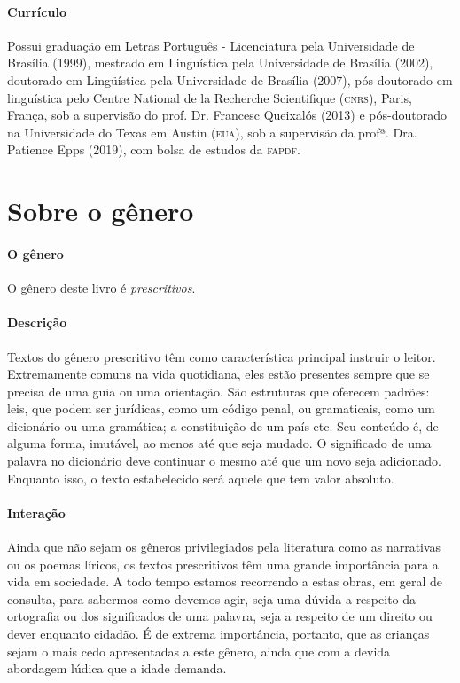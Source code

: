 \documentclass[11pt]{extarticle}
\begin{document}
{{\paragraph{Currículo}
Possui graduação em Letras Português - Licenciatura pela Universidade de Brasília (1999), mestrado em Linguística pela Universidade de Brasília (2002), doutorado em Lingüística pela Universidade de Brasília (2007), pós-doutorado em linguística pelo Centre National de la Recherche Scientifique (\textsc{cnrs}), Paris, França, sob a supervisão do prof. Dr. Francesc Queixalós (2013) e pós-doutorado na Universidade do Texas em Austin (\textsc{eua}), sob a supervisão da profª. Dra. Patience Epps (2019), com bolsa de estudos da \textsc{fapdf}. 


\section{Sobre o gênero}

\paragraph{O gênero} O gênero deste livro é \textit{prescritivos}. 

\paragraph{Descrição} 
Textos do gênero prescritivo têm como característica principal instruir
o leitor. Extremamente comuns na vida quotidiana, eles estão presentes
sempre que se precisa de uma guia ou uma orientação. São estruturas 
que oferecem padrões: leis, que podem ser jurídicas, como um código
penal, ou gramaticais, como um dicionário ou uma gramática; a constituição
de um país etc. Seu conteúdo é, de alguma forma, imutável, ao menos até que seja
mudado. O significado de uma palavra no dicionário deve continuar o mesmo
até que um novo seja adicionado. Enquanto isso, o texto
estabelecido será aquele que tem valor absoluto.


\paragraph{Interação} 
Ainda que não sejam os gêneros privilegiados pela literatura
como as narrativas ou os poemas líricos, os textos prescritivos
têm uma grande importância para a vida em sociedade. A todo 
tempo estamos recorrendo a estas obras, em geral de consulta, para
sabermos como devemos agir, seja uma dúvida a respeito da ortografia ou 
dos significados de uma palavra, seja a respeito de um direito ou dever
enquanto cidadão. É de extrema importância, portanto, que as crianças
sejam o mais cedo apresentadas a este gênero, ainda que com a 
devida abordagem lúdica que a idade demanda. 

}}
\end{document}
